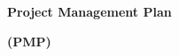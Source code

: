 \documentclass{article}
\begin{document}
\thispagestyle{empty}
\begin{center}
  \vspace*{1cm}
  {\large \grupo}\par\vspace{1.2cm}
  {\LARGE\bfseries \tituloProyecto}\par\vspace{1cm}
  {\Large\bfseries Project Management Plan}\par\vspace{0.3cm}
  {\large\bfseries (PMP)}\par\vspace{2cm}
  \autorUno\par
  \autorDos\par
  \autorTres\par
  \autorCuatro\par
  \vfill
  \universidad\par
  \facultad\par
  \programa\par
  \ciudad\par
  \anio\par
  \vspace{1cm}
\end{center}
\clearpage

\end{document}
